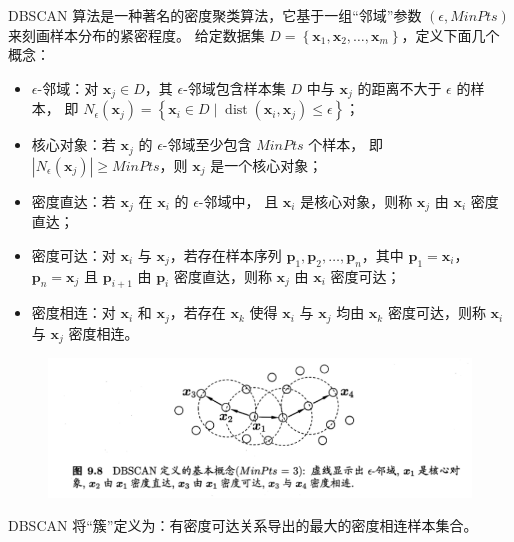 DBSCAN 算法是一种著名的密度聚类算法，它基于一组“邻域”参数 $(\epsilon, MinPts)$ 来刻画样本分布的紧密程度。
给定数据集 $D = \left\{\boldsymbol{x}_1, \boldsymbol{x}_2, \dots, \boldsymbol{x}_m\right\}$，定义下面几个概念：
\begin{itemize}
    \item $\epsilon$-邻域：对 $\boldsymbol{x}_j \in D$，其 $\epsilon$-邻域包含样本集 $D$ 中与 $\boldsymbol{x}_j$ 的距离不大于 $\epsilon$ 的样本，
    即 $N_{\epsilon}\left(\boldsymbol{x}_{j}\right)=\left\{\boldsymbol{x}_{i} \in D \mid \operatorname{dist}\left(\boldsymbol{x}_{i}, \boldsymbol{x}_{j}\right) \leqslant \epsilon\right\}$；
    \item 核心对象：若 $\boldsymbol{x}_j$ 的 $\epsilon$-邻域至少包含 $MinPts$ 个样本，
    即 $\left|N_\epsilon(\boldsymbol{x}_j)\right| \geq MinPts$，则 $\boldsymbol{x}_j$ 是一个核心对象；
    \item 密度直达：若 $\boldsymbol{x}_j$ 在 $\boldsymbol{x}_i$ 的 $\epsilon$-邻域中，
    且 $\boldsymbol{x}_i$ 是核心对象，则称 $\boldsymbol{x}_j$ 由 $\boldsymbol{x}_i$ 密度直达；
    \item 密度可达：对 $\boldsymbol{x}_i$ 与 $\boldsymbol{x}_j$，若存在样本序列 $\boldsymbol{p}_1, \boldsymbol{p}_2, \dots, \boldsymbol{p}_n$，其中 $\boldsymbol{p}_1 = \boldsymbol{x}_i$，$\boldsymbol{p}_n = \boldsymbol{x}_j$ 
    且 $\boldsymbol{p}_{i+1}$ 由 $\boldsymbol{p}_i$ 密度直达，则称 $\boldsymbol{x}_j$ 由 $\boldsymbol{x}_i$ 密度可达；
    \item 密度相连：对 $\boldsymbol{x}_i$ 和 $\boldsymbol{x}_j$，若存在 $\boldsymbol{x}_k$ 使得 $\boldsymbol{x}_i$ 
    与 $\boldsymbol{x}_j$ 均由 $\boldsymbol{x}_k$ 密度可达，则称 $\boldsymbol{x}_i$ 与 $\boldsymbol{x}_j$ 密度相连。
\end{itemize}

\begin{figure}[htbp]
    \centering\includegraphics[scale = 0.5]{DBSCAN.png}
\end{figure}

DBSCAN 将“簇”定义为：有密度可达关系导出的最大的密度相连样本集合。

